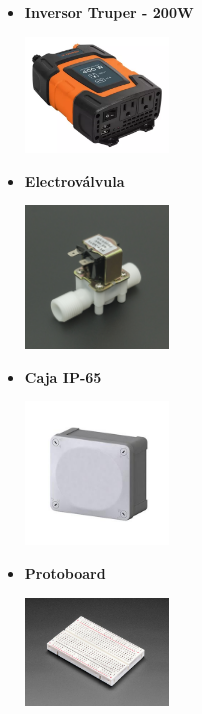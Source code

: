 \documentclass[12pt]{article}
\begin{document}
\begin{itemize}
      \item \textbf{Inversor Truper - 200W}
            \begin{center}
                  \includegraphics[width=0.3\textwidth]{imagenes/inversor.png}
            \end{center}

      \item \textbf{Electroválvula}
            \begin{center}
                  \includegraphics[width=0.3\textwidth]{imagenes/electrovalve.png}
            \end{center}

      \item \textbf{Caja IP-65}
            \begin{center}
                  \includegraphics[width=0.3\textwidth]{imagenes/caja.png}
            \end{center}

      \item \textbf{Protoboard}
            \begin{center}
                  \includegraphics[width=0.3\textwidth]{imagenes/breadboard.png}
            \end{center}


\end{itemize}
\end{document}
